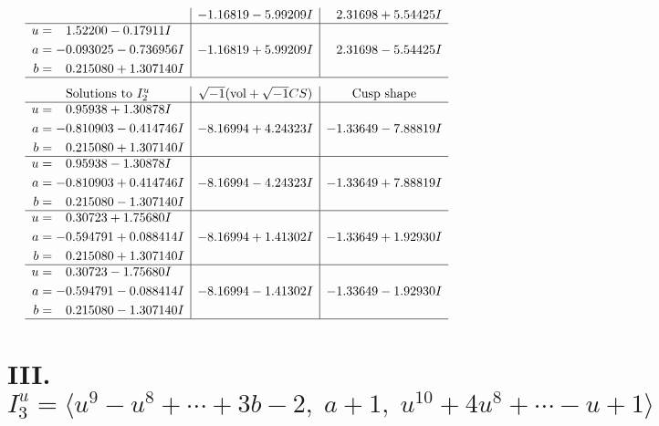 \documentclass[1p]{elsarticle_modified}
\theoremstyle{definition}
\newcommand{\I}{\sqrt{-1}}
\begin{document}
$$\begin{array}{c|c|c}
 & -1.16819 - 5.99209 I & \phantom{-}2.31698 + 5.54425 I \\ \hline\begin{aligned}
u &= \phantom{-}1.52200 - 0.17911 I \\
a &= -0.093025 - 0.736956 I \\
b &= \phantom{-}0.215080 + 1.307140 I\end{aligned}
 & -1.16819 + 5.99209 I & \phantom{-}2.31698 - 5.54425 I\\
 \hline 
 \end{array}$$\newpage$$\begin{array}{c|c|c}  
\text{Solutions to }I^u_{2}& \I (\text{vol} + \sqrt{-1}CS) & \text{Cusp shape}\\
 \hline 
\begin{aligned}
u &= \phantom{-}0.95938 + 1.30878 I \\
a &= -0.810903 - 0.414746 I \\
b &= \phantom{-}0.215080 + 1.307140 I\end{aligned}
 & -8.16994 + 4.24323 I & -1.33649 - 7.88819 I \\ \hline\begin{aligned}
u &= \phantom{-}0.95938 - 1.30878 I \\
a &= -0.810903 + 0.414746 I \\
b &= \phantom{-}0.215080 - 1.307140 I\end{aligned}
 & -8.16994 - 4.24323 I & -1.33649 + 7.88819 I \\ \hline\begin{aligned}
u &= \phantom{-}0.30723 + 1.75680 I \\
a &= -0.594791 + 0.088414 I \\
b &= \phantom{-}0.215080 + 1.307140 I\end{aligned}
 & -8.16994 + 1.41302 I & -1.33649 + 1.92930 I \\ \hline\begin{aligned}
u &= \phantom{-}0.30723 - 1.75680 I \\
a &= -0.594791 - 0.088414 I \\
b &= \phantom{-}0.215080 - 1.307140 I\end{aligned}
 & -8.16994 - 1.41302 I & -1.33649 - 1.92930 I\\
 \hline 
 \end{array}$$\newpage\newpage\renewcommand{\arraystretch}{1}
\centering \section*{III. $I^u_{3}= \langle u^9- u^8+\cdots+3 b-2,\;a+1,\;u^{10}+4 u^8+\cdots- u+1 \rangle$}
\end{document}
